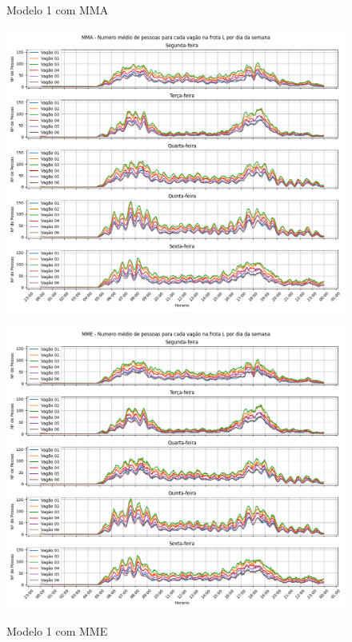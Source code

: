 \documentclass[acronym,symbols,table]{fei}
\begin{document}
\begin{figure}[!htb]
	\centering
	\begin{minipage}{0.5\textwidth}
		\caption{Modelo 1 com MMA}
		    \includegraphics[width=1\linewidth]{Imagens/MMA_-_Numero_medio_de_pessoas_para_cada_vagao_na_frota_L_por_dia_da_semana.png}
    \label{fig:mmamodelo1}
	\end{minipage}\hfill
	\begin{minipage}{0.5\textwidth}
		\caption{ Modelo 1 com MME}
		    \includegraphics[width=1\linewidth]{Imagens/MME_-_Numero_medio_de_pessoas_para_cada_vagao_na_frota_L_por_dia_da_semana.png}
    \label{fig:mmemodelo1}
	\end{minipage}
\end{figure}
\end{document}
